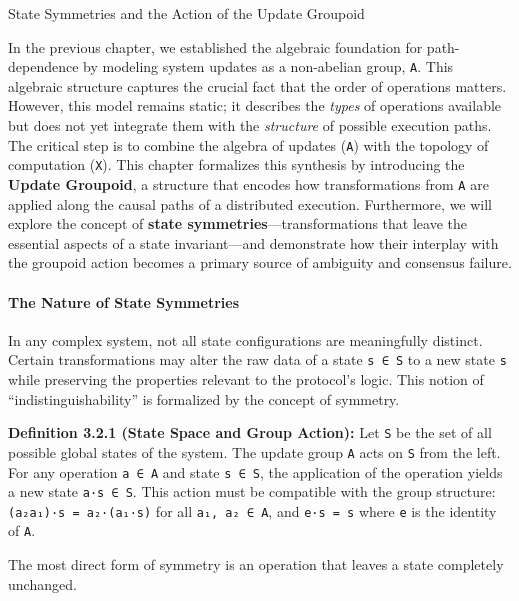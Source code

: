 \documentclass[
]{article}
\begin{document}
\protect{}\label{chapter-3-2-State_Symmetries_and_the_Action_of_the_U}{}

State Symmetries and the Action of the Update Groupoid

In the previous chapter, we established the algebraic foundation for
path-dependence by modeling system updates as a non-abelian group,
\texttt{A}. This algebraic structure captures the crucial fact that the
order of operations matters. However, this model remains static; it
describes the \emph{types} of operations available but does not yet
integrate them with the \emph{structure} of possible execution paths.
The critical step is to combine the algebra of updates (\texttt{A}) with
the topology of computation (\texttt{X}). This chapter formalizes this
synthesis by introducing the \textbf{Update Groupoid}, a structure that
encodes how transformations from \texttt{A} are applied along the causal
paths of a distributed execution. Furthermore, we will explore the
concept of \textbf{state symmetries}---transformations that leave the
essential aspects of a state invariant---and demonstrate how their
interplay with the groupoid action becomes a primary source of ambiguity
and consensus failure.

\paragraph{The Nature of State
Symmetries}\label{the-nature-of-state-symmetries}

In any complex system, not all state configurations are meaningfully
distinct. Certain transformations may alter the raw data of a state
\texttt{s\ ∈\ S} to a new state \texttt{s\textquotesingle{}} while
preserving the properties relevant to the protocol's logic. This notion
of ``indistinguishability'' is formalized by the concept of symmetry.

\textbf{Definition 3.2.1 (State Space and Group Action):} Let \texttt{S}
be the set of all possible global states of the system. The update group
\texttt{A} acts on \texttt{S} from the left. For any operation
\texttt{a\ ∈\ A} and state \texttt{s\ ∈\ S}, the application of the
operation yields a new state \texttt{a·s\ ∈\ S}. This action must be
compatible with the group structure: \texttt{(a₂a₁)·s\ =\ a₂·(a₁·s)} for
all \texttt{a₁,\ a₂\ ∈\ A}, and \texttt{e·s\ =\ s} where \texttt{e} is
the identity of \texttt{A}.

The most direct form of symmetry is an operation that leaves a state
completely unchanged.
\end{document}
